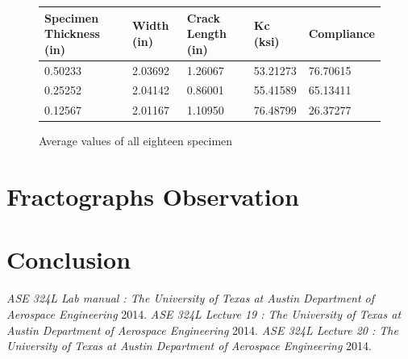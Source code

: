 \documentclass[12pt]{report}
\begin{document}
\begin{figure}[H]
    \singlespacing
    \begin{tabular}{| l | l | l | l | l |}
    \hline
    Specimen Thickness (in) & Width (in) & Crack Length (in) & Kc (ksi) & Compliance \\ \hline
    0.50233 & 2.03692 & 1.26067 & 53.21273 & 76.70615\\ \hline
    0.25252 & 2.04142 & 0.86001 & 55.41589 & 65.13411\\ \hline
    0.12567 & 2.01167 & 1.10950 & 76.48799 & 26.37277\\ \hline
    \end{tabular}
    \caption{Average values of all eighteen specimen}
\end{figure}
\doublespacing

\section{Fractographs Observation}


\section{Conclusion}
\doublespacing



\begin{thebibliography}{0}
 {\em ASE 324L Lab manual : The University of Texas at Austin Department of Aerospace Engineering}  2014.
 {\em ASE 324L Lecture 19 : The University of Texas at Austin Department of Aerospace Engineering}  2014.
 {\em ASE 324L Lecture 20 : The University of Texas at Austin Department of Aerospace Engineering}  2014.
\end{thebibliography}
\end{document}
